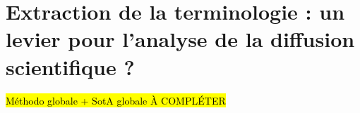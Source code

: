 \label{circulations}


%




\section{Extraction de la terminologie : un levier pour l'analyse de la diffusion scientifique ?}
\hl{Méthodo globale + SotA globale À COMPLÉTER}

